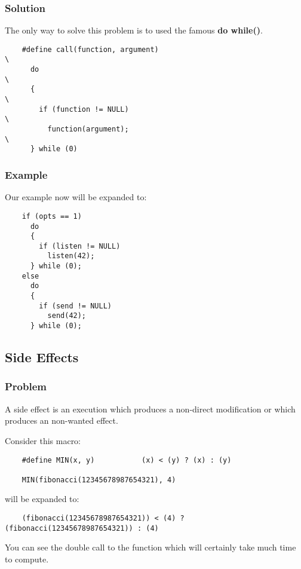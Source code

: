 
\begin{frame}[containsverbatim]
  \frametitle{Solution}

  The only way to solve this problem is to used the famous
  \textbf{do while()}.

  \begin{verbatim}
    #define call(function, argument)                                    \
      do                                                                \
      {                                                                 \
        if (function != NULL)                                           \
          function(argument);                                           \
      } while (0)
  \end{verbatim}
\end{frame}


\begin{frame}[containsverbatim]
  \frametitle{Example}

  Our example now will be expanded to:

  \begin{verbatim}
    if (opts == 1)
      do
      {
        if (listen != NULL)
          listen(42);
      } while (0);
    else
      do
      {
        if (send != NULL)
          send(42);
      } while (0);
  \end{verbatim}
\end{frame}

%
%

\subsection{Side Effects}


\begin{frame}[containsverbatim]
  \frametitle{Problem}

  A side effect is an execution which produces a non-direct modification
  or which produces an non-wanted effect.

  \nl

  Consider this macro:

  \begin{verbatim}
    #define MIN(x, y)           (x) < (y) ? (x) : (y)

    MIN(fibonacci(12345678987654321), 4)
  \end{verbatim}

  will be expanded to:

  \begin{verbatim}
    (fibonacci(12345678987654321)) < (4) ? (fibonacci(12345678987654321)) : (4)
  \end{verbatim}

  You can see the double call to the function which will certainly take
  much time to compute.
\end{frame}

